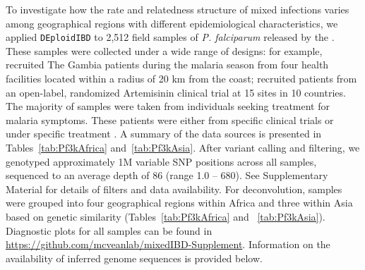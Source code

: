 \documentclass[9pt,lineno]{elife}
\begin{document}
To investigate how the rate and relatedness structure of mixed infections varies among geographical regions with different epidemiological characteristics, we applied \texttt{DEploidIBD} to 2,512 field samples of {\it P. falciparum} released by the \citet{pf3k}.  These samples were collected under a wide range of designs: for example, \citet{Amambua-Ngwa2012} recruited The Gambia patients during the malaria season from four health facilities located within a radius of 20 km from the coast; \citet{Ashley2014} recruited patients from an open-label, randomized Artemisinin clinical trial at 15 sites in 10 countries. The majority of samples were taken from individuals seeking treatment for malaria symptoms. These patients were either from specific clinical trials \citep{Ocholla2014} or under specific treatment \citep{Duffy2015, Miotto2013,eLife2016}.  A summary of the data sources is presented in Tables~\ref{tab:Pf3kAfrica} and~\ref{tab:Pf3kAsia}.  After variant calling and filtering, we genotyped approximately 1M variable SNP positions across all samples, sequenced to an average depth of 86 (range 1.0 – 680).  See Supplementary Material for details of filters and data availability.  For deconvolution, samples were grouped into four geographical regions within Africa and three within Asia based on genetic similarity (Tables~\ref{tab:Pf3kAfrica} and ~\ref{tab:Pf3kAsia}).  Diagnostic plots for all samples can be found in \url{https://github.com/mcveanlab/mixedIBD-Supplement}.  Information on the availability of inferred genome sequences is provided below.
\end{document}
